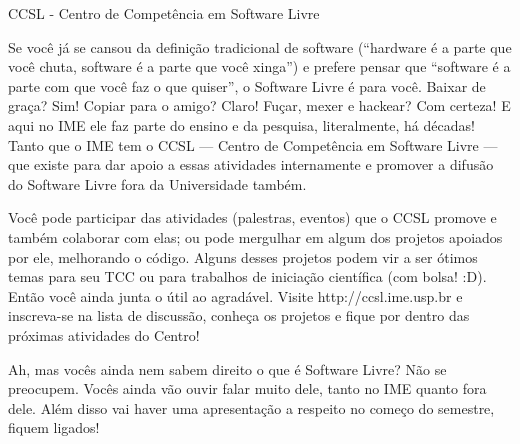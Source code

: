 \begin{secao}{CCSL - Centro de Competência em Software Livre}

Se você já se cansou da definição tradicional de software (``hardware é a parte
que você chuta, software é a parte que você xinga'') e prefere pensar que
``software é a parte com que você faz o que quiser'', o Software Livre é para
você. Baixar de graça? Sim! Copiar para o amigo? Claro! Fuçar, mexer e hackear?
Com certeza! E aqui no IME ele faz parte do ensino e da pesquisa, literalmente,
há décadas! Tanto que o IME tem o CCSL --- Centro de Competência em Software
Livre --- que existe para dar apoio a essas atividades internamente e promover a
difusão do Software Livre fora da Universidade também.

Você pode participar das atividades (palestras, eventos) que o CCSL
promove e também colaborar com elas; ou pode mergulhar em algum dos
projetos apoiados por ele, melhorando o código. Alguns desses projetos
podem vir a ser ótimos temas para seu TCC ou para trabalhos de
iniciação científica (com bolsa! :D). Então você ainda junta o útil ao
agradável. Visite http://ccsl.ime.usp.br e inscreva-se na lista de discussão,
conheça os projetos e fique por dentro das próximas atividades do
Centro!

Ah, mas vocês ainda nem sabem direito o que é Software Livre? Não se preocupem.
Vocês ainda vão ouvir falar muito dele, tanto no IME quanto fora dele. Além
disso vai haver uma apresentação a respeito no começo do semestre, fiquem
ligados! %

\end{secao}
